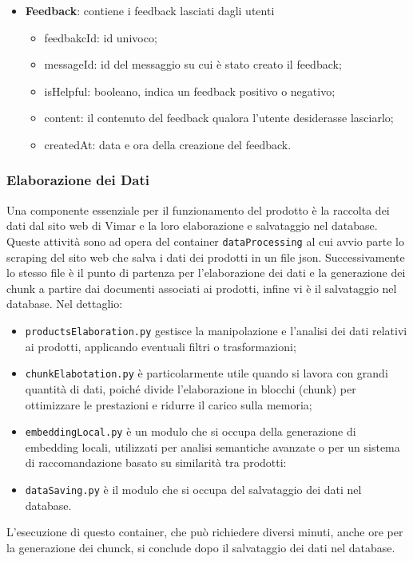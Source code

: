 \begin{itemize}
    \item \textbf{Feedback}: contiene i feedback lasciati dagli utenti
    \begin{itemize}
        \item feedbakcId: id univoco;
        \item messageId: id del messaggio su cui è stato creato il feedback;
        \item isHelpful: booleano, indica un feedback positivo o negativo;
        \item content: il contenuto del feedback qualora l'utente desiderasse lasciarlo;
        \item createdAt: data e ora della creazione del feedback.
    \end{itemize} 
\end{itemize}


\subsubsection{Elaborazione dei Dati}
Una  componente essenziale per il funzionamento del prodotto è la raccolta dei dati dal sito web di Vimar e la loro elaborazione e salvataggio nel database. Queste attività sono ad opera del container  \texttt{dataProcessing} al cui avvio parte lo scraping del sito web che salva i dati dei prodotti in un file json. Successivamente lo stesso file è il punto di partenza per l'elaborazione dei dati e la generazione dei chunk a partire dai documenti associati ai prodotti, infine vi è il salvataggio nel database.  
Nel dettaglio:
\begin{itemize}
\item \texttt{productsElaboration.py} gestisce la manipolazione e l'analisi dei dati relativi ai prodotti, applicando eventuali filtri o trasformazioni;
\item \texttt{chunkElabotation.py} è particolarmente utile quando si lavora con grandi quantità di dati, poiché divide l'elaborazione in blocchi (chunk) per ottimizzare le prestazioni e ridurre il carico sulla memoria;
\item \texttt{embeddingLocal.py} è un modulo che si occupa della generazione di embedding locali,  utilizzati per analisi semantiche avanzate o per un sistema di raccomandazione basato su similarità tra prodotti:
\item \texttt{dataSaving.py} è il modulo che si occupa del salvataggio dei dati nel database.
\end{itemize}

L'esecuzione di questo container, che può richiedere diversi minuti, anche ore per la generazione dei chunck, si conclude dopo il salvataggio dei dati nel database.

